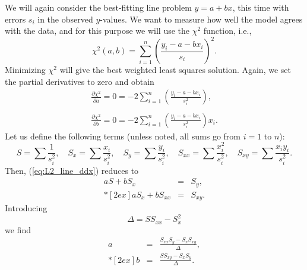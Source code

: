 We will again consider the best-fitting line problem $y = a + bx$, this time with errors $s_i$ in the observed $y$-values.  We 
want to measure how well the model agrees with the data, and for this purpose we will use the $\chi^2$ 
function, i.e.,
\begin{equation}
\chi^2(a,b) = \sum^n_{i=1} \left ( \frac{y_i - a - bx_i}{s_i} \right ) ^2.
\label{eq:L2_line_chi2}
\end{equation}
Minimizing $\chi^2$  will give the best weighted least squares solution.  Again, we set the partial 
derivatives to zero and obtain
\begin{equation}
\begin{array}{c}
\displaystyle \frac{\partial \chi^2}{\partial a} = 0 = -2 \sum^n_{i=1} \left( \frac{y_i -a -bx_i}{s^2_i}\right),  \\
\ \\
\displaystyle \frac{\partial \chi^2}{\partial b} = 0 = -2 \sum^n_{i=1} \left( \frac{y_i -a -bx_i}{s^2_i}\right) x_i.
\end{array}
\label{eq:L2_line_ddx}
\end{equation}
Let us define the following terms (unless noted, all sums go from $i = 1$ to $n$):
\begin{equation}
S = \sum \frac{1}{s^2_i}, \quad S_x = \sum \frac{x_i}{s^2_i}, \quad S_y = 
\sum \frac{y_i}{s^2_i}, \quad S_{xx} = \sum \frac{x^2_i}{s^2_i}, \quad
S_{xy} = \sum \frac{x_i y_i}{s^2_i}.
\end{equation}
Then, (\ref{eq:L2_line_ddx}) reduces to
\begin{equation}
\begin{array}{rcl}
\displaystyle
aS  + bS_x & = & S_y, \\*[2ex]
aS_x + bS_{xx} & = & S_{xy}.
\end{array}
\end{equation} 	 
Introducing 
\begin{equation}
\Delta = SS_{xx} - S ^2 _x
\end{equation}
we find
\begin{equation}
\begin{array}{rcl}
a & = & \displaystyle \frac{S_{xx}S_y - S_x S_{xy}}{\Delta},\\*[2ex]
b & = & \displaystyle \frac{S S_{xy}- S_x S_{y}}{\Delta}.
\end{array}
\label{eq:L2_sol_ab}
\end{equation}
